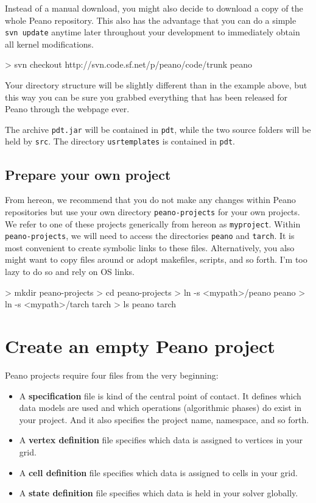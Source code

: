 Instead of a manual download, you might also decide to download a copy of the
whole Peano repository. 
This also has the advantage that you can do a simple \texttt{svn update} anytime
later throughout your development to immediately obtain all kernel
modifications.


\begin{code}
> svn checkout http://svn.code.sf.net/p/peano/code/trunk peano
\end{code}

\noindent
Your directory structure will be slightly different than in the example above,
but this way you can be sure you grabbed everything that has been released for
Peano through the webpage ever.

The archive \texttt{pdt.jar} will be contained in \texttt{pdt}, while the two
source folders will be held by \texttt{src}.
The directory \texttt{usrtemplates} is contained in \texttt{pdt}.


\subsection{Prepare your own project}


From hereon, we recommend that you do not make any changes within Peano
repositories but use your own directory \texttt{peano-projects} for your own
projects.
We refer to one of these projects generically from hereon as \texttt{myproject}.
Within \texttt{peano-projects}, we will need to access the directories
\texttt{peano} and \texttt{tarch}.
It is most convenient to create symbolic links to these files.
Alternatively, you also might want to copy files around or adopt makefiles,
scripts, and so forth.
I'm too lazy to do so and rely on OS links.


\begin{code}
> mkdir peano-projects
> cd peano-projects
> ln -s <mypath>/peano peano
> ln -s <mypath>/tarch tarch
> ls
  peano   tarch
\end{code}




\section{Create an empty Peano project}

Peano projects require four files from the very beginning:

\begin{itemize}
  \item A {\bf specification} file is kind of the central point of contact. It
  defines which data models are used and which operations (algorithmic phases)
  do exist in your project. And it also specifies the project name, namespace,
  and so forth.
  \item A {\bf vertex definition} file specifies which data is assigned to
  vertices in your grid.
  \item A {\bf cell definition} file specifies which data is assigned to
  cells in your grid.
  \item A {\bf state definition} file specifies which data is held in your
  solver globally.
\end{itemize}


